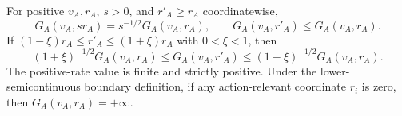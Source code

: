 For positive \(v_A,r_A\), \(s>0\), and \(r'_A\geq r_A\) coordinatewise,
\[
G_A(v_A,sr_A)=s^{-1/2}G_A(v_A,r_A),\qquad G_A(v_A,r'_A)\leq G_A(v_A,r_A).
\]
If \((1-\xi)r_A\leq r'_A\leq(1+\xi)r_A\) with \(0<\xi<1\), then
\[
(1+\xi)^{-1/2}G_A(v_A,r_A)\leq G_A(v_A,r'_A)\leq(1-\xi)^{-1/2}G_A(v_A,r_A).
\]
The positive-rate value is finite and strictly positive.  Under the lower-semicontinuous boundary definition, if any action-relevant coordinate \(r_i\) is zero, then \(G_A(v_A,r_A)=+\infty\).